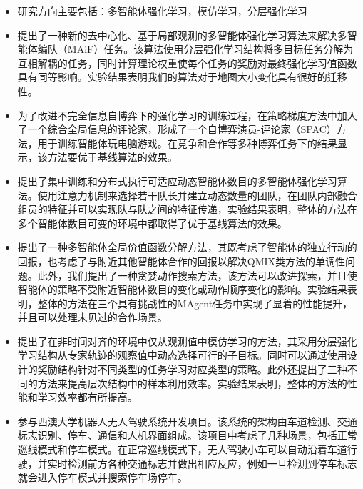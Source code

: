 
{\small
  \begin{itemize}
    \item 研究方向主要包括：多智能体强化学习，模仿学习，分层强化学习
    \item 提出了一种新的去中心化、基于局部观测的多智能体强化学习算法来解决多智能体编队（MAiF）任务。该算法使用分层强化学习结构将多目标任务分解为互相解耦的任务，同时计算理论权重使每个任务的奖励对最终强化学习值函数具有同等影响。实验结果表明我们的算法对于地图大小变化具有很好的迁移性。
    \item 为了改进不完全信息自博弈下的强化学习的训练过程，在策略梯度方法中加入了一个综合全局信息的评论家，形成了一个自博弈演员-评论家（SPAC）方法，用于训练智能体玩电脑游戏。在竞争和合作等多种博弈任务下的结果显示，该方法要优于基线算法的效果。
    \item 提出了集中训练和分布式执行可适应动态智能体数目的多智能体强化学习算法。使用注意力机制来选择若干队长并建立动态数量的团队，在团队内部融合组员的特征并可以实现队与队之间的特征传递，实验结果表明，整体的方法在多个智能体数目可变的环境中都取得了优于基线算法的效果。
    \item 提出了一种多智能体全局价值函数分解方法，其既考虑了智能体的独立行动的回报，也考虑了与附近其他智能体合作的回报以解决QMIX类方法的单调性问题。此外，我们提出了一种贪婪动作搜索方法，该方法可以改进探索，并且使智能体的策略不受附近智能体数目的变化或动作顺序变化的影响。实验结果表明，整体的方法在三个具有挑战性的MAgent任务中实现了显着的性能提升，并且可以处理未见过的合作场景。
    \item 提出了在非时间对齐的环境中仅从观测值中模仿学习的方法，其采用分层强化学习结构从专家轨迹的观察值中动态选择可行的子目标。同时可以通过使用设计的奖励结构针对不同类型的任务学习对应类型的策略。此外还提出了三种不同的方法来提高层次结构中的样本利用效率。实验结果表明，整体的方法的性能和学习效率都有所提高。
  \end{itemize}
}

{\small
  \begin{itemize}
    \item 参与西澳大学机器人无人驾驶系统开发项目。该系统的架构由车道检测、交通标志识别、停车、通信和人机界面组成。该项目中考虑了几种场景，包括正常巡线模式和停车模式。在正常巡线模式下，无人驾驶小车可以自动沿着车道行驶，并实时检测前方各种交通标志并做出相应反应，例如一旦检测到停车标志就会进入停车模式并搜索停车场停车。
  \end{itemize}
}


